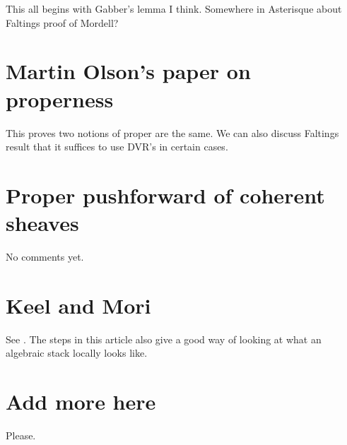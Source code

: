 \noindent
This all begins with Gabber's lemma I think. Somewhere in Asterisque about
Faltings proof of Mordell?

\section{Martin Olson's paper on properness}
\label{section-proper-parametrization}

\noindent
This proves two notions of proper are the same. We can also discuss Faltings
result that it suffices to use DVR's in certain cases.

\section{Proper pushforward of coherent sheaves}
\label{section-proper-pushforward}

\noindent
No comments yet.

\section{Keel and Mori}
\label{section-keel-mori}

\noindent
See \cite{K-M}. The steps in this article also give a good way of looking at
what an algebraic stack locally looks like.

\section{Add more here}
\label{section-add-more}

\noindent
Please.









